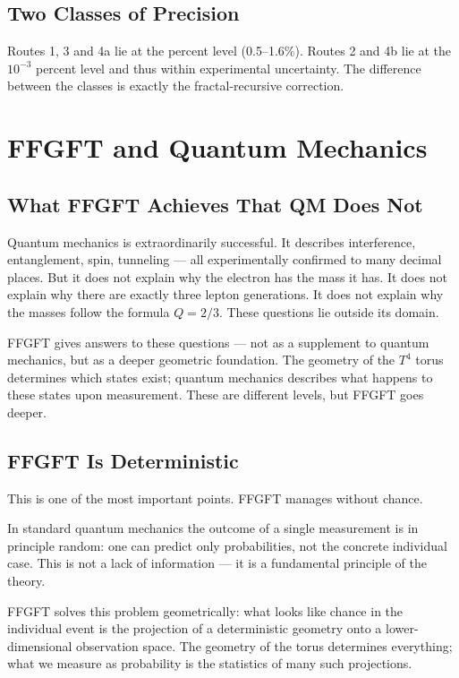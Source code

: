\documentclass[12pt,oneside]{book}
\begin{document}
\section{Two Classes of Precision}

Routes 1, 3 and 4a lie at the percent level (0.5--1.6\%). Routes 2 and 4b lie at the $10^{-3}$ percent level and thus within experimental uncertainty. The difference between the classes is exactly the fractal-recursive correction.

\chapter{FFGFT and Quantum Mechanics}

\section{What FFGFT Achieves That QM Does Not}

Quantum mechanics is extraordinarily successful. It describes interference, entanglement, spin, tunneling --- all experimentally confirmed to many decimal places. But it does not explain why the electron has the mass it has. It does not explain why there are exactly three lepton generations. It does not explain why the masses follow the formula $Q = 2/3$. These questions lie outside its domain.

FFGFT gives answers to these questions --- not as a supplement to quantum mechanics, but as a deeper geometric foundation. The geometry of the $T^4$ torus determines which states exist; quantum mechanics describes what happens to these states upon measurement. These are different levels, but FFGFT goes deeper.

\section{FFGFT Is Deterministic}

This is one of the most important points. FFGFT manages without chance.

In standard quantum mechanics the outcome of a single measurement is in principle random: one can predict only probabilities, not the concrete individual case. This is not a lack of information --- it is a fundamental principle of the theory.

FFGFT solves this problem geometrically: what looks like chance in the individual event is the projection of a deterministic geometry onto a lower-dimensional observation space. The geometry of the torus determines everything; what we measure as probability is the statistics of many such projections.
\end{document}

